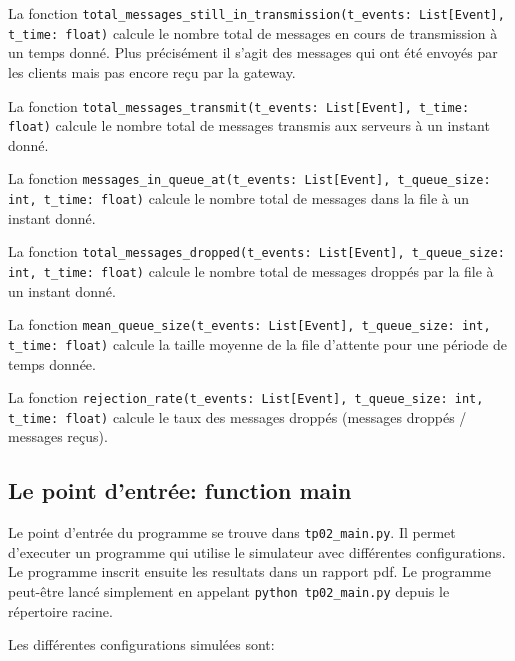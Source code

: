 \documentclass[11pt,a4paper]{article}
\begin{document}
La fonction \mbox{\lstinline|total_messages_still_in_transmission(t_events: List[Event], t_time: float)|} calcule le nombre total de messages en cours de transmission à un temps donné. Plus précisément il s'agit des messages qui ont été envoyés par les clients mais pas encore reçu par la gateway.

La fonction \lstinline|total_messages_transmit(t_events: List[Event], t_time: float)| calcule le nombre total de messages transmis aux serveurs à un instant donné.

La fonction \lstinline|messages_in_queue_at(t_events: List[Event], t_queue_size: int, t_time: float)| calcule le nombre total de messages dans la file à un instant donné.

La fonction \lstinline|total_messages_dropped(t_events: List[Event], t_queue_size: int, t_time: float)| calcule le nombre total de messages droppés par la file à un instant donné.

La fonction \mbox{\lstinline|mean_queue_size(t_events: List[Event], t_queue_size: int, t_time: float)|} calcule la taille moyenne de la file d'attente pour une période de temps donnée.

La fonction \mbox{\lstinline|rejection_rate(t_events: List[Event], t_queue_size: int, t_time: float)|} calcule le taux des messages droppés (messages droppés / messages reçus).

\bigskip

\subsection{Le point d'entrée: function main}

Le point d'entrée du programme se trouve dans \lstinline|tp02_main.py|. Il permet d'executer un programme qui utilise le simulateur avec différentes configurations. Le programme inscrit ensuite les resultats dans un rapport pdf.
Le programme peut-être lancé simplement en appelant \lstinline|python tp02_main.py| depuis le répertoire racine.

Les différentes configurations simulées sont:
\end{document}
